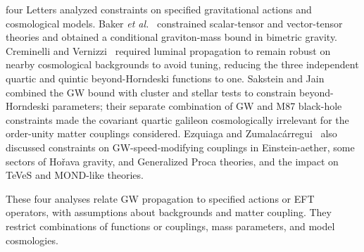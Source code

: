 four Letters analyzed constraints on specified gravitational actions
and cosmological models. Baker \emph{et al.}~\cite{BakerBellini2017}
constrained scalar-tensor and vector-tensor theories and obtained a
conditional graviton-mass bound in bimetric gravity. Creminelli and
Vernizzi~\cite{CreminelliVernizzi2017} required luminal propagation
to remain robust on nearby cosmological backgrounds to avoid tuning,
reducing the three independent quartic and quintic beyond-Horndeski
functions to one. Sakstein and Jain~\cite{SaksteinJain2017} combined
the GW bound with cluster and stellar tests to constrain
beyond-Horndeski parameters; their separate combination of GW and M87
black-hole constraints made the covariant quartic galileon
cosmologically irrelevant for the order-unity matter couplings
considered. Ezquiaga and
Zumalac\'arregui~\cite{EzquiagaZumalacarregui2017} also discussed
constraints on GW-speed-modifying couplings in Einstein-aether,
some sectors of Ho\v{r}ava gravity, and Generalized Proca theories,
and the impact on TeVeS and MOND-like theories.

These four analyses relate GW propagation to specified actions or EFT
operators, with assumptions about backgrounds and matter coupling.
They restrict combinations of functions or couplings, mass parameters,
and model cosmologies.
